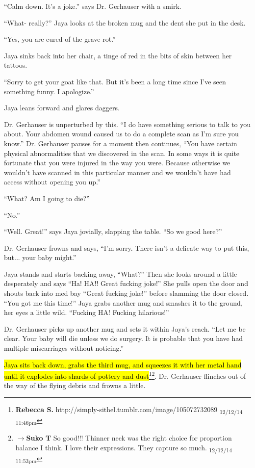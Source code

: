 ``Calm down.  It's a joke.'' says Dr. Gerhauser with a smirk.

``What- really?''  Jaya looks at the broken mug and the dent she put in the desk.

``Yes, you are cured of the grave rot.''  

Jaya sinks back into her chair, a tinge of red in the bits of skin between her tattoos.

``Sorry to get your goat like that.  But it's been a long time since I've seen something funny.  I apologize.''

Jaya leans forward and glares daggers.

Dr. Gerhauser is unperturbed by this. ``I do have something serious to talk to you about. Your abdomen wound caused us to do a complete scan as I'm sure you know.''  Dr. Gerhauser pauses for a moment then continues, ``You have certain physical abnormalities that we discovered in the scan.  In some ways it is quite fortunate that you were injured in the way you were. Because otherwise we wouldn't have scanned in this particular manner and we wouldn't have had access without opening you up.''

``What?  Am I going to die?''

``No.''

``Well.  Great!'' says Jaya jovially, slapping the table. ``So we good here?''

Dr. Gerhauser frowns and says, ``I'm sorry.  There isn't a delicate way to put this, but... your baby might.''

Jaya stands and starts backing away, ``What?''  Then she looks around a little desperately and says ``Ha!  HA!!  Great fucking joke!'' She pulls open the door and shouts back into med bay ``Great fucking joke!'' before slamming the door closed.  ``You got me this time!'' Jaya grabs another mug and smashes it to the ground, her eyes a little wild.  ``Fucking HA!  Fucking hilarious!''

Dr. Gerhauser picks up another mug and sets it within Jaya's reach.  ``Let me be clear.  Your baby will die unless we do surgery.  It is probable that you have had multiple miscarriages without noticing.''

\hl{Jaya sits back down, grabs the third mug, and squeezes it with her metal hand until it explodes into shards of pottery and dust}\footnote{\textbf{Rebecca S. }http://simply-sithel.tumblr.com/image/105072732089 \textsubscript{12/12/14 11:46pm}}\footnote{$\rightarrow$\textbf{Suko T }So good!!!  Thinner neck was the right choice for proportion balance I think.  I love their expressions.  They capture so much. \textsubscript{12/12/14 11:53pm}}.  Dr. Gerhauser flinches out of the way of the flying debris and frowns a little.  

